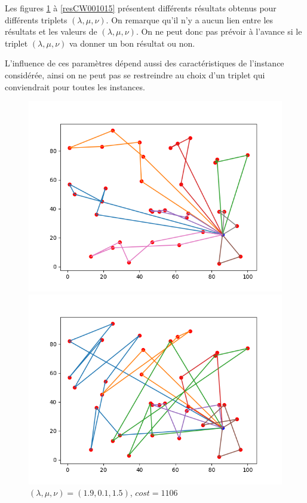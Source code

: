 \documentclass[a4paper,11pt]{article}%
\begin{document}
Les figures \ref{resCW190105} à \ref{resCW001015} présentent différents résultats obtenus pour différents triplets $(\lambda, \mu, \nu)$.
On remarque qu'il n'y a aucun lien entre les résultats et les valeurs de $(\lambda, \mu, \nu)$. 
On ne peut donc pas prévoir à l'avance si le triplet $(\lambda, \mu, \nu)$ va donner un bon résultat ou non.

L'influence de ces paramètres dépend aussi des caractéristiques de l'instance considérée, ainsi on ne peut pas se restreindre au choix d'un triplet qui conviendrait pour toutes les instances. 

\begin{figure}
    \begin{minipage}[c]{.42\linewidth}
        \centering
	\includegraphics[scale=0.4]{resCW190105.png}
 
 	\caption{$(\lambda, \mu, \nu)=(1.9,0.1,1.5)$, $ cost = 1106$}
 	\label{resCW190105}
    \end{minipage}
	\hfill%
    \begin{minipage}[c]{.42\linewidth}
        \centering
	\includegraphics[scale=0.4]{resCW111.png}
	

\end{minipage}
\end{figure}
\end{document}
